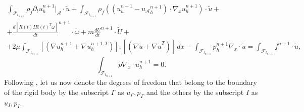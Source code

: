 \documentclass[graybox]{svmult}
\newcommand{\Fluid}{\mathcal{F}} %
\newcommand{\Alemap}{\mathcal{A}} %
\newcommand{\Vel}{u} %
\newcommand{\Pres}{p} %
\newcommand{\tvel}{U} %
\newcommand{\angvel}{\omega} %
\newcommand{\Solid}{\mathcal{S}} %
\newcommand{\normal}{n} %
\newcommand{\CompDomain}{\Fluid}
\begin{document}
\begin{multline}
	\int_{\CompDomain_{t_{n+1}}} \rho_f\partial_t \Vel_h^{n+1}|_\Alemap  \cdot \tilde{\Vel} + \int_{\CompDomain_{t_{n+1}}} \rho_f((\Vel_h^{n+1}-{\Vel_{\mathcal{A}}}_h^{n+1} )\cdot \nabla_x u_h^{n+1}) \cdot \tilde{\Vel}+
 \\
 + \frac{d[R(t)IR(t)^T\angvel]}{dt}^{n+1} \cdot \tilde{\angvel}+m\frac{d\tvel}{dt}^{n+1}\cdot \tilde{\tvel} +
	\\ + 
	2\mu\int_{\CompDomain_{t_{n+1}}} [(\nabla \Vel_h^{n+1} + \nabla \Vel_h^{n+1,T})] :  [(\nabla \tilde{\Vel} + \nabla \tilde{\Vel}^T)]  \, dx  %
	-\int_{\CompDomain_{t_{n+1}}} \Pres_h^{n+1} \nabla_x\cdot \tilde{\Vel} = \int_{\CompDomain_{t_{n+1}}} f^{n+1} \cdot \tilde{\Vel},
	\label{Eq:discrete-var_form}
\end{multline}
\begin{equation}
	\int_{\CompDomain_{t_{n+1}}} \tilde{\Pres} \nabla_x\cdot \Vel_h^{n+1} = 0.
	\label{Eq:discrete-var_form2}
\end{equation}
Following \cite{maury}, let us now denote the degrees of freedom that belong to the boundary of the rigid body by the subscript $\Gamma$ as $\Vel_\Gamma, \Pres_\Gamma$ and the others by the subscript $I$ as $\Vel_I, \Pres_I$.
\end{document}
